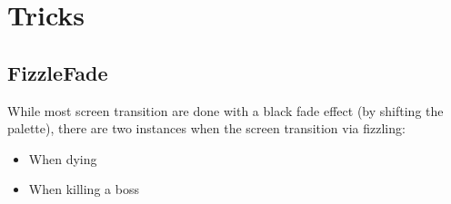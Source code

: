 \section{Tricks}






\subsection{FizzleFade}
While most screen transition are done with a black fade effect (by shifting the palette), there are two instances
when the screen transition via fizzling:
\begin{itemize}
	\item When dying
	\item When killing a boss
\end{itemize}


